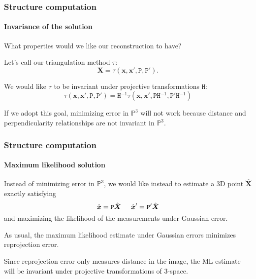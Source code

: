 \documentclass[aspectratio=169]{beamer}
\renewcommand{\vec}[1]{\boldsymbol{#1}}
\newcommand{\mat}[1]{\mathtt{#1}}
\def\Pset{\mathbb{P}}
\begin{document}
\begin{frame}
\frametitle{Structure computation}
\framesubtitle{Invariance of the solution}

What \alert{properties} would we like our reconstruction to have?

\medskip

Let's call our triangulation method $\tau$:
\begin{equation*}
\vec{X} = \tau( \vec{x}, \vec{x}', \mat{P}, \mat{P}' ).
\end{equation*}

\medskip

We would like $\tau$ to be \alert{invariant under projective
  transformations} $\mat{H}$:
\begin{equation*}
\tau( \vec{x}, \vec{x}', \mat{P}, \mat{P}' ) = \mat{H}^{-1}
\tau( \vec{x}, \vec{x}', \mat{P}\mat{H}^{-1}, \mat{P}'\mat{H}^{-1} )
\end{equation*}

\medskip

If we adopt this goal, minimizing error in $\Pset^3$ will not work
because \alert{distance} and \alert{perpendicularity} relationships
are \alert{not invariant} in $\Pset^3$.

\end{frame}

\begin{frame}
\frametitle{Structure computation}
\framesubtitle{Maximum likelihood solution}

Instead of minimizing error in $\Pset^3$, we would like instead to
estimate a 3D point $\hat{\vec{X}}$ exactly satisfying
\begin{equation*}
\hat{\vec{x}}=\mat{P}\hat{\vec{X}} \hspace{0.2in}
\hat{\vec{x}}'=\mat{P}'\hat{\vec{X}}
\end{equation*}
and maximizing the likelihood of the measurements under Gaussian
error.

\medskip

As usual, the maximum likelihood estimate under Gaussian errors
minimizes \alert{reprojection error}.

\medskip

Since reprojection error only measures distance in the \alert{image},
the ML estimate will be \alert{invariant} under projective
transformations of 3-space.

\end{frame}
\end{document}
